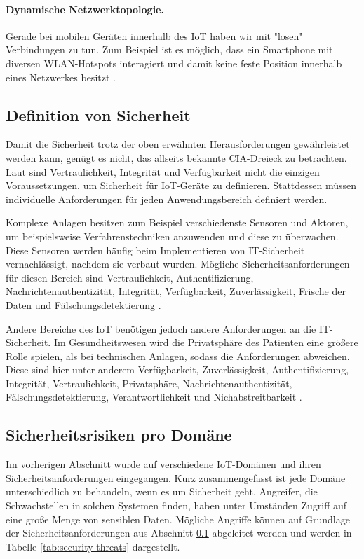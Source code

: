 \paragraph{Dynamische Netzwerktopologie.}
Gerade bei mobilen Geräten innerhalb des IoT haben wir mit "losen" Verbindungen
zu tun. Zum Beispiel ist es möglich, dass ein Smartphone mit diversen
WLAN-Hotspots interagiert und damit keine feste Position innerhalb eines
Netzwerkes besitzt \cite{paper}.

\subsection{Definition von Sicherheit}\label{sec:def-security}
Damit die Sicherheit trotz der oben erwähnten Herausforderungen ge\-währ\-lei\-stet
werden kann, genügt es nicht, das allseits bekannte CIA-Dreieck zu betrachten.
Laut \cite{paper} sind Vertraulichkeit, Integrität und Verfügbarkeit nicht die
einzigen Voraussetzungen, um Sicherheit für IoT-Geräte zu definieren.
Stattdessen müssen individuelle Anforderungen für jeden Anwendungsbereich
definiert werden.

Komplexe Anlagen besitzen zum Beispiel verschiedenste Sensoren und Aktoren, um
beispielsweise Verfahrenstechniken anzuwenden und diese zu über\-wachen. Diese
Sensoren werden häufig beim Implementieren von IT-Sich\-er\-heit vernachlässigt,
nachdem sie verbaut wurden. Mögliche Sicherheitsanforderungen für
diesen Bereich sind Vertraulichkeit, Authentifizierung,
Nachrichtenauthentizität, Integrität, Verfügbarkeit, Zuverlässigkeit, Frische
der Daten und Fälschungsdetektierung \cite{paper}.

Andere Bereiche des IoT benötigen jedoch andere Anforderungen an die
IT-Sicherheit. Im Gesundheitswesen wird die Privatsphäre des Patienten eine
größere Rolle spielen, als bei technischen Anlagen, sodass die Anforderungen
abweichen. Diese sind hier unter anderem Verfügbarkeit, Zuverlässigkeit,
Authentifizierung, Integrität, Vertraulichkeit, Privatsphäre,
Nachrichtenauthentizität, Fälschungsdetektierung, Verantwortlichkeit und
Nichabstreitbarkeit \cite{paper}.

\subsection{Sicherheitsrisiken pro Domäne}
Im vorherigen Abschnitt wurde auf verschiedene IoT-Domänen und ihren
Sicherheitsanforderungen eingegangen. Kurz zusammengefasst ist jede Domäne
unterschiedlich zu behandeln, wenn es um Sicherheit geht. Angreifer, die
Schwachstellen in solchen Systemen finden, haben unter Umständen Zugriff auf
eine große Menge von sensiblen Daten. Mögliche Angriffe können auf Grundlage der
Sicherheitsanforderungen aus Abschnitt \ref{sec:def-security} abgeleitet werden
\cite{paper} und werden in Tabelle \ref{tab:security-threats} dargestellt.

